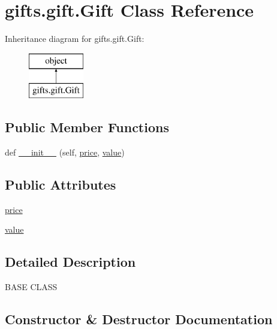 \hypertarget{classgifts_1_1gift_1_1_gift}{}\section{gifts.\+gift.\+Gift Class Reference}
\label{classgifts_1_1gift_1_1_gift}
Inheritance diagram for gifts.\+gift.\+Gift\+:\begin{figure}[H]
\begin{center}
\leavevmode
\includegraphics[height=2.000000cm]{classgifts_1_1gift_1_1_gift}
\end{center}
\end{figure}
\subsection*{Public Member Functions}
\begin{DoxyCompactItemize}
\item 
def \hyperlink{classgifts_1_1gift_1_1_gift_a22b2a85b8fa30f583ab33703d3910c06}{\+\_\+\+\_\+init\+\_\+\+\_\+} (self, \hyperlink{classgifts_1_1gift_1_1_gift_a590be1b8c14aa430dd354c413fdea9f3}{price}, \hyperlink{classgifts_1_1gift_1_1_gift_ac42ec6ccacc5e1bb0df09465798bce9b}{value})
\end{DoxyCompactItemize}
\subsection*{Public Attributes}
\begin{DoxyCompactItemize}
\item 
\hyperlink{classgifts_1_1gift_1_1_gift_a590be1b8c14aa430dd354c413fdea9f3}{price}
\item 
\hyperlink{classgifts_1_1gift_1_1_gift_ac42ec6ccacc5e1bb0df09465798bce9b}{value}
\end{DoxyCompactItemize}


\subsection{Detailed Description}
\begin{DoxyVerb}BASE CLASS\end{DoxyVerb}
 

\subsection{Constructor \& Destructor Documentation}

